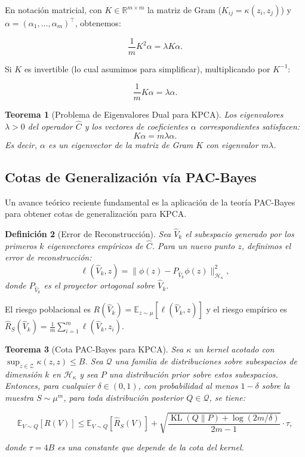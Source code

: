 \documentclass[11pt]{article}
\theoremstyle{plain}
\newtheorem{theorem}{Teorema}[section]
\newtheorem{definition}[theorem]{Definición}
\newcommand{\KL}{\operatorname{KL}}
\begin{document}
En notación matricial, con $K \in \mathbb{R}^{m \times m}$ la matriz de Gram ($K_{ij} = \kappa(z_i, z_j)$) y $\alpha = (\alpha_1, \ldots, \alpha_m)^\top$, obtenemos:

\[
\frac{1}{m} K^2 \alpha = \lambda K \alpha.
\]

Si $K$ es invertible (lo cual asumimos para simplificar), multiplicando por $K^{-1}$:

\[
\frac{1}{m} K \alpha = \lambda \alpha.
\]

\begin{theorem}[Problema de Eigenvalores Dual para KPCA]
\label{thm:kpca_dual}
Los eigenvalores $\lambda > 0$ del operador $\hat{C}$ y los vectores de coeficientes $\alpha$ correspondientes satisfacen:
\[
K \alpha = m \lambda \alpha.
\]
Es decir, $\alpha$ es un eigenvector de la matriz de Gram $K$ con eigenvalor $m\lambda$.
\end{theorem}

\subsection{Cotas de Generalización vía PAC-Bayes}

Un avance teórico reciente fundamental es la aplicación de la teoría PAC-Bayes para obtener cotas de generalización para KPCA.

\begin{definition}[Error de Reconstrucción]
Sea $\hat{V}_k$ el subespacio generado por los primeros $k$ eigenvectores empíricos de $\hat{C}$. Para un nuevo punto $z$, definimos el error de reconstrucción:
\[
\ell(\hat{V}_k, z) = \| \phi(z) - P_{\hat{V}_k} \phi(z) \|^2_{\mathcal{H}_\kappa},
\]
donde $P_{\hat{V}_k}$ es el proyector ortogonal sobre $\hat{V}_k$.
\end{definition}

El riesgo poblacional es $R(\hat{V}_k) = \mathbb{E}_{z \sim \mu}[\ell(\hat{V}_k, z)]$ y el riesgo empírico es $\hat{R}_S(\hat{V}_k) = \frac{1}{m} \sum_{i=1}^m \ell(\hat{V}_k, z_i)$.

\begin{theorem}[Cota PAC-Bayes para KPCA]
\label{thm:pacbayes_kpca}
Sea $\kappa$ un kernel acotado con $\sup_{z \in \mathcal{Z}} \kappa(z, z) \leq B$. Sea $\mathcal{Q}$ una familia de distribuciones sobre subespacios de dimensión $k$ en $\mathcal{H}_\kappa$ y sea $P$ una distribución prior sobre estos subespacios. Entonces, para cualquier $\delta \in (0,1)$, con probabilidad al menos $1-\delta$ sobre la muestra $S \sim \mu^m$, para toda distribución posterior $Q \in \mathcal{Q}$, se tiene:

\[
\mathbb{E}_{V \sim Q}[R(V)] \leq \mathbb{E}_{V \sim Q}[\hat{R}_S(V)] + \sqrt{\frac{\KL(Q\|P) + \log(2m/\delta)}{2m-1}} \cdot \tau,
\]

donde $\tau = 4B$ es una constante que depende de la cota del kernel.
\end{theorem}
\end{document}
